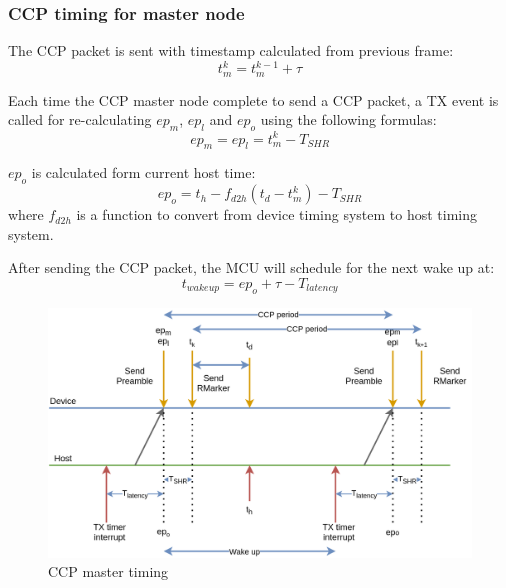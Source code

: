 \documentclass[\main/main.tex]{subfiles}
\begin{document}
\subsubsection{CCP timing for master node}

The CCP packet is sent with timestamp calculated from previous frame:
\begin{equation}
    t^k_m = t^{k-1}_m + \tau
\end{equation}

Each time the CCP master node complete to send a CCP packet, a TX event is called for re-calculating $ep_m$, $ep_l$ and $ep_o$ using the following formulas:
\begin{equation}
    ep_m = ep_l = t^k_m - T_{SHR}
\end{equation}

$ep_o$ is calculated form current host time:
\begin{equation}
    ep_o = t_h - f_{d2h}(t_d - t^k_m) - T_{SHR}
\end{equation}
where $f_{d2h}$ is a function to convert from device timing system to host timing system.

After sending the CCP packet, the MCU will schedule for the next wake up at:
\begin{equation}
    t_{wake up} = ep_o + \tau - T_{latency}
\end{equation}

\begin{figure}[H]
    \begin{center}
        \includegraphics[width=1\textwidth]{ccp_timing_for_master_node.png}
    \end{center}
    \caption{CCP master timing}
    \label{fig:interupt_latency_master}
\end{figure}
\end{document}
